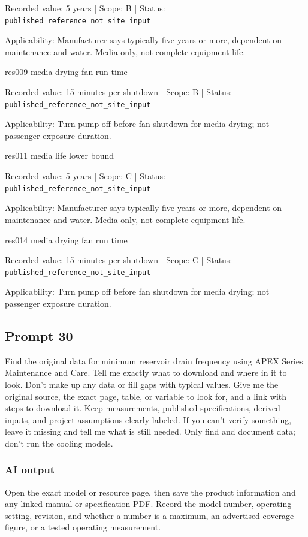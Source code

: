 Recorded value: 5 years | Scope: B | Status: \nolinkurl{published_reference_not_site_input}

Applicability: Manufacturer says typically five years or more, dependent on maintenance and water. Media only, not complete equipment life.

res009  media drying fan run time

Recorded value: 15 minutes per shutdown | Scope: B | Status: \nolinkurl{published_reference_not_site_input}

Applicability: Turn pump off before fan shutdown for media drying; not passenger exposure duration.

res011  media life lower bound

Recorded value: 5 years | Scope: C | Status: \nolinkurl{published_reference_not_site_input}

Applicability: Manufacturer says typically five years or more, dependent on maintenance and water. Media only, not complete equipment life.

res014  media drying fan run time

Recorded value: 15 minutes per shutdown | Scope: C | Status: \nolinkurl{published_reference_not_site_input}

Applicability: Turn pump off before fan shutdown for media drying; not passenger exposure duration.

\subsection*{Prompt 30}
Find the original data for minimum reservoir drain frequency using APEX Series Maintenance and Care. Tell me exactly what to download and where in it to look. Don’t make up any data or fill gaps with typical values. Give me the original source, the exact page, table, or variable to look for, and a link with steps to download it. Keep measurements, published specifications, derived inputs, and project assumptions clearly labeled. If you can’t verify something, leave it missing and tell me what is still needed. Only find and document data; don’t run the cooling models.

\subsubsection*{AI output}
Open the exact model or resource page, then save the product information and any linked manual or specification PDF. Record the model number, operating setting, revision, and whether a number is a maximum, an advertised coverage figure, or a tested operating measurement.

